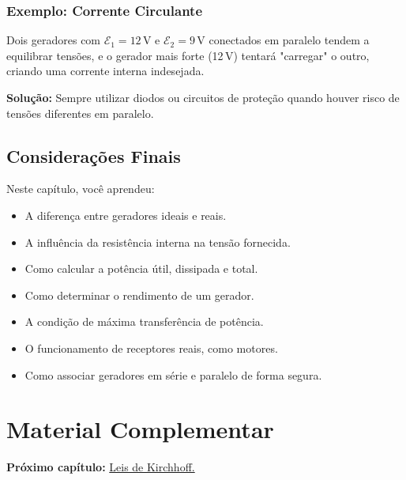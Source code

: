 \subsubsection{Exemplo: Corrente Circulante}
Dois geradores com $\mathcal{E}_1 = 12\,\text{V}$ e $\mathcal{E}_2 = 9\,\text{V}$ conectados em paralelo tendem a equilibrar tensões, e o gerador mais forte (12 V) tentará "carregar" o outro, criando uma corrente interna indesejada.

\textbf{Solução:} Sempre utilizar diodos ou circuitos de proteção quando houver risco de tensões diferentes em paralelo.

\subsection{Considerações Finais}
Neste capítulo, você aprendeu:

\begin{itemize}
    \item A diferença entre geradores ideais e reais.
    \item A influência da resistência interna na tensão fornecida.
    \item Como calcular a potência útil, dissipada e total.
    \item Como determinar o rendimento de um gerador.
    \item A condição de máxima transferência de potência.
    \item O funcionamento de receptores reais, como motores.
    \item Como associar geradores em série e paralelo de forma segura.
\end{itemize}

\section{Material Complementar}



\vspace{0.5cm}
\noindent\textbf{Próximo capítulo:} \hyperref[cap7]{Leis de Kirchhoff.}


